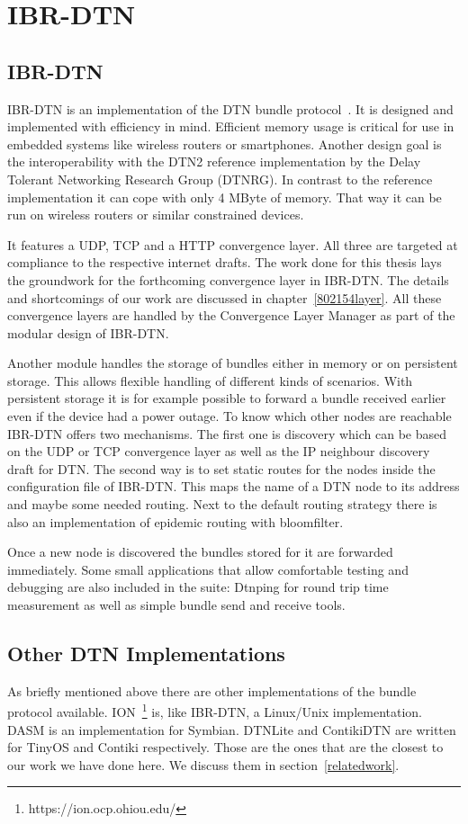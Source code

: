 \chapter{IBR-DTN}
\label{ibr-dtn}
\section{IBR-DTN}

IBR-DTN is an implementation of the DTN bundle protocol~\cite{RFC5050}. It is
designed and implemented with efficiency in mind. Efficient memory usage is critical
for use in embedded systems like wireless routers or smartphones. Another design
goal is the interoperability with the DTN2 reference implementation by the Delay
Tolerant Networking Research Group (DTNRG). In contrast to the reference
implementation it can cope with only 4 MByte of memory. That way it can be run
on wireless routers or similar constrained devices.

It features a UDP, TCP and a HTTP convergence layer. All three are targeted at
compliance to the respective internet drafts. The work done for this thesis lays
the groundwork for the forthcoming convergence layer in IBR-DTN. The details and
shortcomings of our work are discussed in chapter~\ref{802154layer}. All these
convergence layers are handled by the Convergence Layer Manager as part of the
modular design of IBR-DTN.

Another module handles the storage of bundles either in memory or on persistent
storage. This allows flexible handling of different kinds of scenarios. With
persistent storage it is for example possible to forward a bundle received earlier
even if the device had a power outage. To know which other nodes are reachable
IBR-DTN offers two mechanisms. The first one is discovery which can be based on
the UDP or TCP convergence layer as well as the IP neighbour discovery draft for
DTN. The second way is to set static routes for the nodes inside the
configuration file of IBR-DTN. This maps the name of a DTN node to its address
and maybe some needed routing. Next to the default routing strategy there is
also an implementation of epidemic routing with bloomfilter.

Once a new node is discovered the bundles stored for it are forwarded immediately.
Some small applications that allow comfortable testing and debugging are also
included in the suite: Dtnping for round trip time measurement as well as simple bundle
send and receive tools.

\section{Other DTN Implementations}

As briefly mentioned above there are other implementations of the bundle
protocol available. ION~\footnote{https://ion.ocp.ohiou.edu/} is, like IBR-DTN, a Linux/Unix implementation. DASM is
an implementation for Symbian. DTNLite and ContikiDTN are written for TinyOS and
Contiki respectively. Those are the ones that are the closest to our work we
have done here. We discuss them in section~\ref{relatedwork}.
